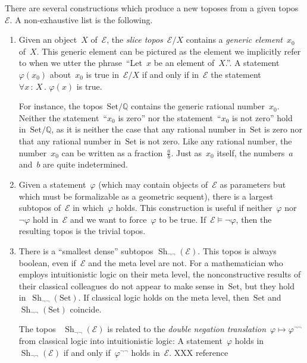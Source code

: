 \documentclass[oneside,reqno]{amsart}
\theoremstyle{definition}
\theoremstyle{plain}
\theoremstyle{remark}
\newcommand{\E}{\mathcal{E}}
\newcommand{\QQ}{\mathbb{Q}}
\DeclareMathOperator{\Sh}{Sh}
\newcommand{\Set}{\mathrm{Set}}
\renewcommand{\_}{\mathpunct{.}\,}
\newcommand{\?}{\,{:}\,}
\begin{document}
There are several constructions which produce a new toposes from a given
topos~$\E$. A non-exhaustive list is the following.
\begin{enumerate}
\item Given an object~$X$ of~$\E$, the \emph{slice topos}~$\E/X$
contains a \emph{generic element}~$x_0$ of~$X$. This generic element can be
pictured as the element we implicitly refer to when we utter the
phrase~``Let~$x$ be an element of~$X$.''. A statement~$\varphi(x_0)$
about~$x_0$ is true in~$\E/X$ if and only if in~$\E$ the statement~$\forall x
\? X\_ \varphi(x)$ is true.

For instance, the topos~$\Set/\QQ$ contains the generic rational number~$x_0$.
Neither the statement~``$x_0$ is zero'' nor the statement~``$x_0$ is not zero''
hold in~$\Set/\QQ$, as it is neither the case that any rational number
in~$\Set$ is zero nor that any rational number in~$\Set$ is not zero. Like any
rational number, the number~$x_0$ can be written as a fraction~$\frac{a}{b}$.
Just as~$x_0$ itself, the numbers~$a$ and~$b$ are quite indetermined.
\item Given a statement~$\varphi$ (which may contain objects of~$\E$ as
parameters but which must be formalizable as a geometric sequent), there is a
largest subtopos of~$\E$ in which~$\varphi$ holds. This construction is useful
if neither~$\varphi$ nor~$\neg\varphi$ hold in~$\E$ and we want to
force~$\varphi$ to be true. If~$\E \models \neg\varphi$, then the resulting
topos is the trivial topos.
\item There is a ``smallest dense'' subtopos $\Sh_{\neg\neg}(\E)$. This topos
is always boolean, even if~$\E$ and the meta level are not. For a mathematician who employs
intuitionistic logic on their meta level, the nonconstructive results of their
classical colleagues do not appear to make sense in~$\Set$, but they hold
in~$\Sh_{\neg\neg}(\Set)$. If classical logic holds on the meta level,
then~$\Set$ and~$\Sh_{\neg\neg}(\Set)$ coincide.

The topos~ $\Sh_{\neg\neg}(\E)$ is related to the \emph{double negation
translation}~$\varphi \mapsto \varphi^{\neg\neg}$ from classical logic into
intuitionistic logic: A statement~$\varphi$ holds in~$\Sh_{\neg\neg}(\E)$ if
and only if~$\varphi^{\neg\neg}$ holds in~$\E$. XXX reference
\end{enumerate}
\end{document}
